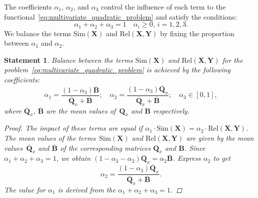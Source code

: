 \documentclass[12pt,twoside]{article}
\newtheorem{statement}{Statement}
\newcommand{\bY}{\mathbf{Y}}
\newcommand{\bX}{\mathbf{X}}
\newcommand{\bB}{\mathbf{B}}
\newcommand{\bQ}{\mathbf{Q}}
\begin{document}
The coefficients $\alpha_1$, $\alpha_2$, and $\alpha_3$ control the influence of each term to the functional~\eqref{eq:multivariate_quadratic_problem} and satisfy the conditions:
\[
\alpha_1 + \alpha_2 + \alpha_3 = 1 \quad \alpha_i \geq 0, \, i = 1, 2, 3.
\] 
We balance the terms $\text{Sim}(\bX)$ and $\text{Rel}(\bX, \bY)$ by fixing the proportion between $\alpha_1$ and $\alpha_2$.

\begin{statement}
	Balance between the terms $\text{Sim}(\bX)$ and $\text{Rel}(\bX, \bY)$ for the problem~\eqref{eq:multivariate_quadratic_problem} is achieved by the following coefficients:
	\[
		\alpha_1 = \frac{(1 - \alpha_3)\overline{\bB}}{\overline{\bQ}_x + \overline{\bB}}; \quad
		\alpha_2 = \frac{(1 - \alpha_3)\overline{\bQ}_x}{\overline{\bQ}_x + \overline{\bB}}; \quad
		\alpha_3 \in [0, 1],
	\]
	where $\overline{\bQ}_x$, $\overline{\bB}$ are the mean values of~$\bQ_x$ and $\bB$ respectively.
\begin{proof}
	The impact of these terms are equal if $\alpha_1 \cdot \text{Sim}(\bX)= \alpha_2 \cdot \text{Rel}(\bX, \bY)$. 
	The mean values of the terms~$\text{Sim}(\bX)$ and $\text{Rel}(\bX, \bY)$ are given by the mean values~$\overline{\bQ}_x$ and $\overline{\bB}$ of the corresponding matrices $\bQ_x$ and $\bB$.
	Since $\alpha_1 + \alpha_2 + \alpha_3 = 1$, we obtain $(1 - \alpha_3 - \alpha_2) \overline{\bQ}_x = \alpha_2 \overline{\bB}$. 
	Express $\alpha_2$ to get
	\[
		\alpha_2 = \frac{(1 - \alpha_3)\overline{\bQ}_x}{\overline{\bQ}_x + \overline{\bB}}.
	\]
	The value for $\alpha_1$ is derived from the $\alpha_1 + \alpha_2 + \alpha_3 = 1$.
\end{proof}
\end{statement}
\end{document}
